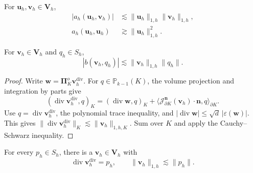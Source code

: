 \documentclass[review,hidelinks,onefignum,onetabnum]{siamart251216}
\begin{document}
\begin{lemma}\label{lem:10}
For $\boldsymbol u_h,\boldsymbol v_h\in\boldsymbol V_h$,
\begin{align*}
|a_h(\boldsymbol{u}_h, \boldsymbol{v}_h)| &\lesssim \|\boldsymbol{u}_h\|_{1,h} \|\boldsymbol{v}_h\|_{1,h}, \\
a_h(\boldsymbol{u}_h, \boldsymbol{u}_h) &\gtrsim  \|\boldsymbol{u}_h\|_{1,h}^2.
\end{align*}
\end{lemma}




\begin{lemma}\label{lem:11}
For $\boldsymbol v_h\in\boldsymbol V_h$ and $q_h\in S_h$,
\[
|b(\boldsymbol v_h,q_h)|\lesssim\|\boldsymbol v_h\|_{1,h}\|q_h\|.
\]
\end{lemma}
\begin{proof}
Write $\boldsymbol w=\boldsymbol\Pi_K^o\boldsymbol v_h^{\operatorname{div}}$.
For $q\in\mathbb P_{k-1}(K)$, the volume projection and integration by parts give
\[
(\operatorname{div}\boldsymbol v_h^{\operatorname{div}},q)_K
=(\operatorname{div}\boldsymbol w,q)_K
+\langle\mathcal J_{\partial K}^{\boldsymbol n}(\boldsymbol v_h)\cdot\boldsymbol n,q\rangle_{\partial K}.
\]
Use $q=\operatorname{div}\boldsymbol v_h^{\operatorname{div}}$, the polynomial
trace inequality, and $|\operatorname{div}\boldsymbol w|\leq
\sqrt d\,|\varepsilon(\boldsymbol w)|$. This gives
$\|\operatorname{div}\boldsymbol v_h^{\operatorname{div}}\|_K
\lesssim\|\boldsymbol v_h\|_{1,h,K}$.
Sum over $K$ and apply the Cauchy--Schwarz inequality.
\end{proof}

\begin{lemma}\label{lem:12}
For every $p_h\in S_h$, there is a $\boldsymbol v_h\in\boldsymbol V_h$ with
\[
\operatorname{div}\boldsymbol v_h^{\operatorname{div}}=p_h,
\qquad\|\boldsymbol v_h\|_{1,h}\lesssim\|p_h\|.
\]
\end{lemma}
\end{document}
